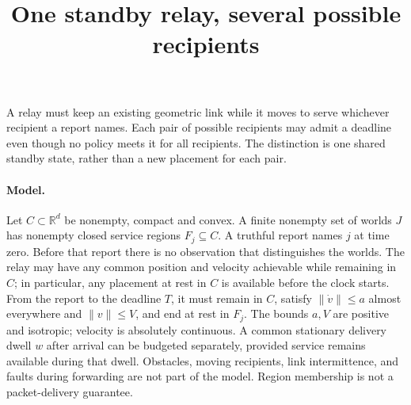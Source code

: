 \documentclass[11pt]{article}
\title{One standby relay, several possible recipients}
\begin{document}
\maketitle

A relay must keep an existing geometric link while it moves to serve
whichever recipient a report names. Each pair of possible recipients may
admit a deadline even though no policy meets it for all recipients. The
distinction is one shared standby state, rather than a new placement for
each pair.

\paragraph{Model.}
Let \(C\subset\mathbb R^d\) be nonempty, compact and convex. A finite
nonempty set of worlds \(J\) has nonempty closed service regions
\(F_j\subseteq C\). A truthful report names \(j\) at time zero.
Before that report there is no observation that distinguishes the worlds.
The relay may have any common position and velocity achievable while
remaining in \(C\); in particular, any placement at rest in \(C\) is
available before the clock starts. From the report to the deadline \(T\),
it must remain in \(C\), satisfy \(\|\dot v\|\le a\) almost everywhere and
\(\|v\|\le V\), and end at rest in \(F_j\). The bounds \(a,V\) are positive
and isotropic; velocity is absolutely continuous. A common stationary
delivery dwell \(w\) after arrival can be budgeted separately, provided
service remains available during that dwell. Obstacles, moving recipients,
link intermittence, and faults during forwarding are not part of the
model. Region membership is not a packet-delivery guarantee.
\end{document}
